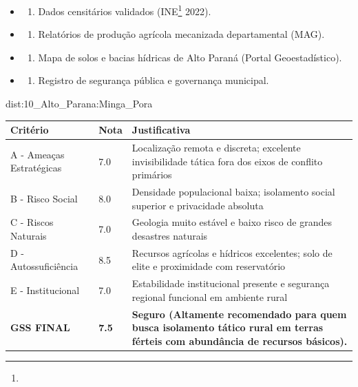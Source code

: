 {\begin{itemize}
\tightlist
\item
  \begin{enumerate}
  \def\labelenumi{\arabic{enumi})}
  \tightlist
  \item
    Dados censitários validados (INE\footnote{\fineINE} 2022).
  \end{enumerate}
\item
  \begin{enumerate}
  \def\labelenumi{\arabic{enumi})}
  \setcounter{enumi}{1}
  \tightlist
  \item
    Relatórios de produção agrícola mecanizada departamental (MAG).
  \end{enumerate}
\item
  \begin{enumerate}
  \def\labelenumi{\arabic{enumi})}
  \setcounter{enumi}{2}
  \tightlist
  \item
    Mapa de solos e bacias hídricas de Alto Paraná (Portal
    Geoestadístico).
  \end{enumerate}
\item
  \begin{enumerate}
  \def\labelenumi{\arabic{enumi})}
  \setcounter{enumi}{3}
  \tightlist
  \item
    Registro de segurança pública e governança municipal.
  \end{enumerate}
\end{itemize}}{dist:10_Alto_Parana:Minga_Pora}
\begin{table}[ht!]
\small \begin{tabular}{p{3.0cm}p{0.8cm}p{6.0cm}} \toprule
\textbf{Critério} & \textbf{Nota} & \textbf{Justificativa} \\ \midrule
A - Ameaças Estratégicas & 7.0 & Localização remota e discreta; excelente invisibilidade tática fora dos eixos de conflito primários \\
B - Risco Social & 8.0 & Densidade populacional baixa; isolamento social superior e privacidade absoluta \\
C - Riscos Naturais & 7.0 & Geologia muito estável e baixo risco de grandes desastres naturais \\
D - Autossuficiência & 8.5 & Recursos agrícolas e hídricos excelentes; solo de elite e proximidade com reservatório \\
E - Institucional & 7.0 & Estabilidade institucional presente e segurança regional funcional em ambiente rural \\
\midrule \textbf{GSS FINAL} & \textbf{7.5} & \textbf{Seguro (Altamente recomendado para quem busca isolamento tático rural em terras férteis com abundância de recursos básicos).} \\ \bottomrule \end{tabular}
\end{table}
